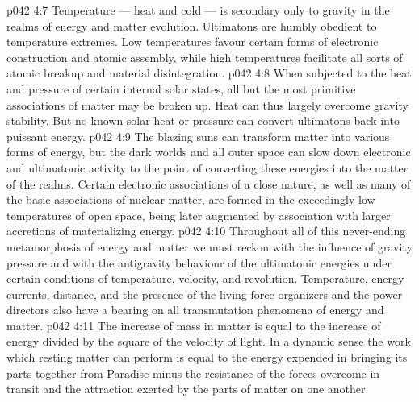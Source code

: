 \vs p042 4:7 Temperature --- heat and cold --- is secondary only to gravity in the realms of energy and matter evolution. Ultimatons are humbly obedient to temperature extremes. Low temperatures favour certain forms of electronic construction and atomic assembly, while high temperatures facilitate all sorts of atomic breakup and material disintegration.
\vs p042 4:8 When subjected to the heat and pressure of certain internal solar states, all but the most primitive associations of matter may be broken up. Heat can thus largely overcome gravity stability. But no known solar heat or pressure can convert ultimatons back into puissant energy.
\vs p042 4:9 The blazing suns can transform matter into various forms of energy, but the dark worlds and all outer space can slow down electronic and ultimatonic activity to the point of converting these energies into the matter of the realms. Certain electronic associations of a close nature, as well as many of the basic associations of nuclear matter, are formed in the exceedingly low temperatures of open space, being later augmented by association with larger accretions of materializing energy.
\vs p042 4:10 Throughout all of this never\hyp{}ending metamorphosis of energy and matter we must reckon with the influence of gravity pressure and with the antigravity behaviour of the ultimatonic energies under certain conditions of temperature, velocity, and revolution. Temperature, energy currents, distance, and the presence of the living force organizers and the power directors also have a bearing on all transmutation phenomena of energy and matter.
\vs p042 4:11 The increase of mass in matter is equal to the increase of energy divided by the square of the velocity of light. In a dynamic sense the work which resting matter can perform is equal to the energy expended in bringing its parts together from Paradise minus the resistance of the forces overcome in transit and the attraction exerted by the parts of matter on one another.
